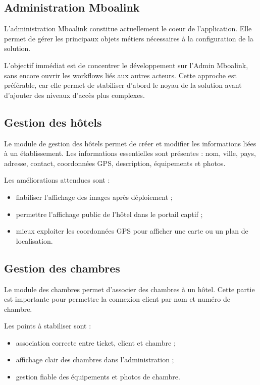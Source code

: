 \documentclass[12pt,a4paper]{article}
\begin{document}
\subsection{Administration Mboalink}

L'administration Mboalink constitue actuellement le coeur de l'application. Elle permet de gérer les principaux objets métiers nécessaires à la configuration de la solution.

L'objectif immédiat est de concentrer le développement sur l'Admin Mboalink, sans encore ouvrir les workflows liés aux autres acteurs. Cette approche est préférable, car elle permet de stabiliser d'abord le noyau de la solution avant d'ajouter des niveaux d'accès plus complexes.

\subsection{Gestion des hôtels}

Le module de gestion des hôtels permet de créer et modifier les informations liées à un établissement. Les informations essentielles sont présentes : nom, ville, pays, adresse, contact, coordonnées GPS, description, équipements et photos.

Les améliorations attendues sont :

\begin{itemize}
  \item fiabiliser l'affichage des images après déploiement ;
  \item permettre l'affichage public de l'hôtel dans le portail captif ;
  \item mieux exploiter les coordonnées GPS pour afficher une carte ou un plan de localisation.
\end{itemize}

\subsection{Gestion des chambres}

Le module des chambres permet d'associer des chambres à un hôtel. Cette partie est importante pour permettre la connexion client par nom et numéro de chambre.

Les points à stabiliser sont :

\begin{itemize}
  \item association correcte entre ticket, client et chambre ;
  \item affichage clair des chambres dans l'administration ;
  \item gestion fiable des équipements et photos de chambre.
\end{itemize}
\end{document}
